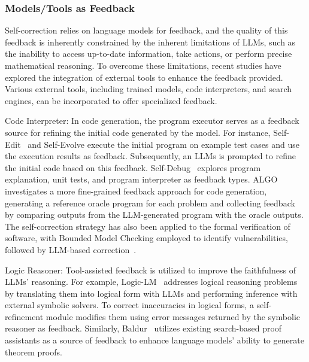 \documentclass[12pt]{extarticle}
\begin{document}
\subsubsection{Models/Tools as Feedback}
Self-correction relies on language models for feedback, and the quality of this feedback is inherently constrained by the inherent limitations of LLMs, such as the inability to access up-to-date information, take actions, or perform precise mathematical reasoning. To overcome these limitations, recent studies have explored the integration of external tools to enhance the feedback provided. Various external tools, including trained models, code interpreters, and search engines, can be incorporated to offer specialized feedback.

Code Interpreter: In code generation, the program executor serves as a feedback source for refining the initial code generated by the model. For instance, Self-Edit~\cite{zhang2023selfedit} and Self-Evolve execute the initial program on example test cases and use the execution results as feedback. Subsequently, an LLMs is prompted to refine the initial code based on this feedback. Self-Debug~\cite{chen2023teaching} explores program explanation, unit tests, and program interpreter as feedback types. ALGO~\cite{zhang2023algo} investigates a more fine-grained feedback approach for code generation, generating a reference oracle program for each problem and collecting feedback by comparing outputs from the LLM-generated program with the oracle outputs. The self-correction strategy has also been applied to the formal verification of software, with Bounded Model Checking employed to identify vulnerabilities, followed by LLM-based correction~\cite{charalambous2023new}.

Logic Reasoner: Tool-assisted feedback is utilized to improve the faithfulness of LLMs' reasoning. For example, Logic-LM~\cite{pan2023logiclm} addresses logical reasoning problems by translating them into logical form with LLMs and performing inference with external symbolic solvers. To correct inaccuracies in logical forms, a self-refinement module modifies them using error messages returned by the symbolic reasoner as feedback. Similarly, Baldur~\cite{first2023baldur} utilizes existing search-based proof assistants as a source of feedback to enhance language models' ability to generate theorem proofs.
\end{document}
